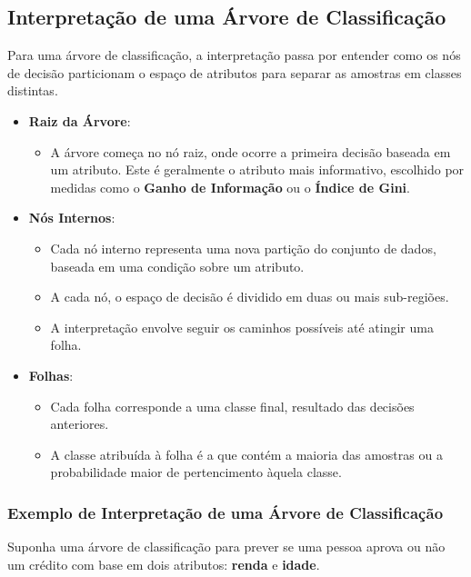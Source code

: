 \documentclass{sciposter}
\begin{document}
\begin{multicols}{3}
\subsection{Interpretação de uma Árvore de Classificação}

Para uma árvore de classificação, a interpretação passa por entender como os nós de decisão particionam o espaço de atributos para separar as amostras em classes distintas.

\begin{itemize}
    \item \textbf{Raiz da Árvore}:
    \begin{itemize}
        \item A árvore começa no nó raiz, onde ocorre a primeira decisão baseada em um atributo. Este é geralmente o atributo mais informativo, escolhido por medidas como o \textbf{Ganho de Informação} ou o \textbf{Índice de Gini}.
    \end{itemize}
    
    \item \textbf{Nós Internos}:
    \begin{itemize}
        \item Cada nó interno representa uma nova partição do conjunto de dados, baseada em uma condição sobre um atributo.
        \item A cada nó, o espaço de decisão é dividido em duas ou mais sub-regiões.
        \item A interpretação envolve seguir os caminhos possíveis até atingir uma folha.
    \end{itemize}
    
    \item \textbf{Folhas}:
    \begin{itemize}
        \item Cada folha corresponde a uma classe final, resultado das decisões anteriores.
        \item A classe atribuída à folha é a que contém a maioria das amostras ou a probabilidade maior de pertencimento àquela classe.
    \end{itemize}
\end{itemize}

\subsubsection{Exemplo de Interpretação de uma Árvore de Classificação}

Suponha uma árvore de classificação para prever se uma pessoa aprova ou não um crédito com base em dois atributos: \textbf{renda} e \textbf{idade}.


\end{multicols}
\end{document}
